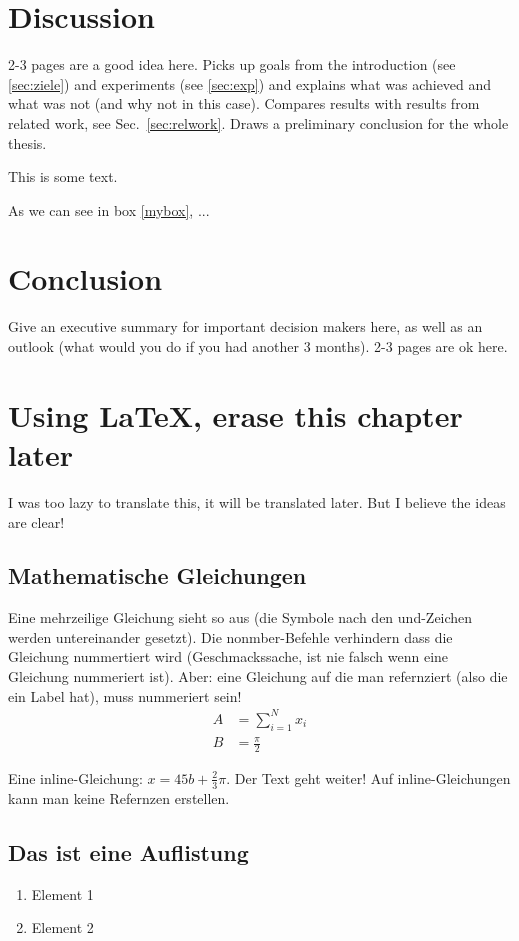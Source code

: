 \documentclass[12pt,oneside]{article}
\begin{document}
\section{Discussion}
2-3 pages are a good idea here. Picks up goals from the introduction (see \ref{sec:ziele}) and experiments (see \ref{sec:exp}) and explains what was achieved and what was not (and why not in this case). Compares results with results from related work, see Sec.~\ref{sec:relwork}. Draws a preliminary conclusion for the whole thesis.
\begin{tcolorbox}[label=mybox]
This is some text.
\end{tcolorbox}

As we can see in box \ref{mybox}, ...
\section{Conclusion}
Give an executive summary for important decision makers here, as well as an outlook (what would you do if you had another 3 months). 2-3 pages are ok here.

\section{Using LaTeX, erase this chapter later}
%
I was too lazy to translate this, it will be translated later. But I believe the ideas are clear!
%
\subsection{Mathematische Gleichungen}
Eine mehrzeilige Gleichung sieht so aus (die Symbole nach den und-Zeichen werden untereinander gesetzt). Die nonmber-Befehle verhindern dass die Gleichung nummertiert wird (Geschmackssache, ist nie falsch wenn eine Gleichung nummeriert ist). Aber: eine Gleichung auf die man refernziert (also die ein Label hat), muss nummeriert sein!
\begin{align}
    A &= \sum_{i=1}^N x_i \label{eq:1}\nonumber\\
    B &= \frac{\pi}{2}
\end{align}

Eine inline-Gleichung: $x=45b + \frac{2}{3}\pi$. Der Text geht weiter! Auf inline-Gleichungen kann man keine Refernzen erstellen.

\subsection{Das ist eine Auflistung}
\begin{enumerate}
\item Element 1
\item Element 2
\end{enumerate}
\end{document}
